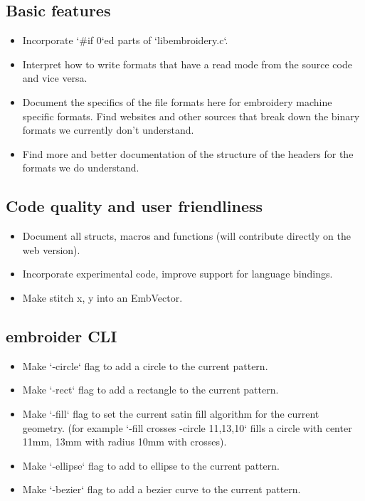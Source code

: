 \documentclass{report}
\begin{document}
\subsection{Basic features}

\begin{itemize}
\item Incorporate `\#if 0`ed parts of `libembroidery.c`.
\item Interpret how to write formats that have a read mode from the source code and vice versa.
\item Document the specifics of the file formats here for embroidery machine specific formats. Find websites and other sources that break down the binary formats we currently don't understand.
\item Find more and better documentation of the structure of the headers for the formats we do understand.
\end{itemize}

\subsection{Code quality and user friendliness}

\begin{itemize}
\item Document all structs, macros and functions (will contribute directly
   on the web version).
\item Incorporate experimental code, improve support for language bindings.
\item Make stitch x, y into an EmbVector.
\end{itemize}

\subsection{embroider CLI}

\begin{itemize}
\item Make `-circle` flag to add a circle to the current pattern.
\item Make `-rect` flag to add a rectangle to the current pattern.
\item Make `-fill` flag to set the current satin fill algorithm for the current geometry. (for example `-fill crosses -circle 11,13,10` fills a circle with center 11mm, 13mm with radius 10mm with crosses).
\item Make `-ellipse` flag to add to ellipse to the current pattern.
\item Make `-bezier` flag to add a bezier curve to the current pattern.
\end{itemize}
\end{document}

